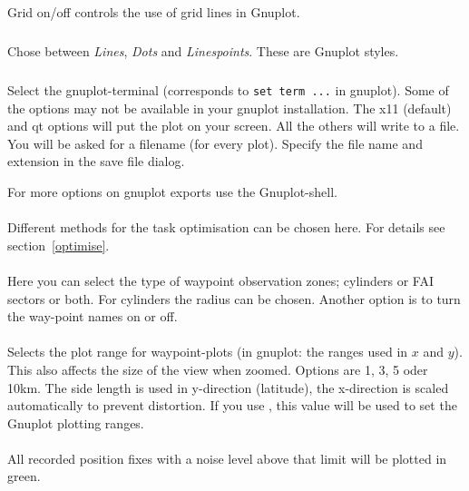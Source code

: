 Grid on/off controls the use of grid lines in Gnuplot.

\subparagraph{
}
Chose between \emph{Lines}, \emph{Dots} and \emph{Linespoints}. These are Gnuplot styles.


\subparagraph{
}
Select the gnuplot-terminal (corresponds to \texttt{set term ...} in gnuplot).
Some of the options may not be available in your gnuplot installation.
The x11 (default) and qt options will put the plot on your screen.
All the others will write to a file. You will be asked for a filename (for
every plot). Specify the file name and extension in the save file dialog.

For more options on gnuplot exports use the Gnuplot-shell.


\paragraph{
}
Different methods for the task optimisation can be chosen here. For details see section~\ref{optimise}.

\paragraph{
}
Here you can select the type of waypoint observation zones; cylinders or FAI
sectors or both. For cylinders the radius can be chosen. Another option is to
turn the way-point names on or off.


\paragraph{}
Selects the plot range for waypoint-plots (in gnuplot: the ranges used in $x$ and $y$).
This also affects the size of the view when zoomed.
Options are 1, 3, 5 oder 10km. The side length
is used in y-direction (latitude), the x-direction is scaled automatically to
prevent distortion.
If you use , this value will be used to set the
Gnuplot plotting ranges.

\paragraph{}
All recorded position fixes with a noise level above that limit will be
plotted in green.

